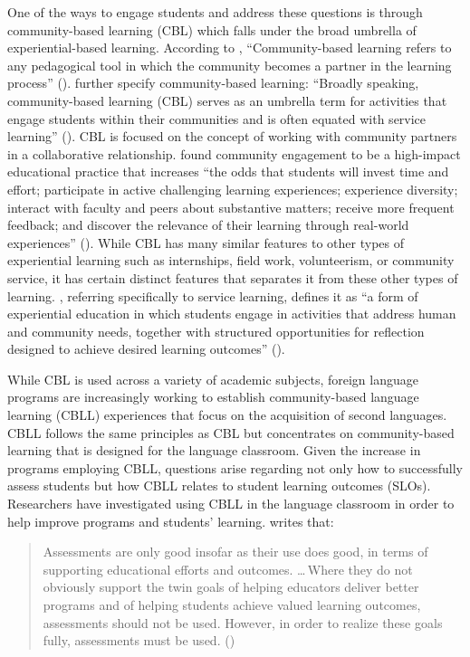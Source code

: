 \documentclass[output=paper]{langscibook}
\begin{document}
One of the ways to engage students and address these questions is through community-based learning (CBL) which falls under the broad umbrella of ex\-pe\-ri\-en\-tial-based learning. According to \citet{MooneyEdwards2001}, “Community-based learning refers to any pedagogical tool in which the community becomes a partner in the learning process” (\citeyear[182]{MooneyEdwards2001}). \citet{CliffordReisinger2019} further specify community-based learning: “Broadly speaking, community-based learning (CBL) serves as an umbrella term for activities that engage students within their communities and is often equated with service learning” (\citeyear[5]{CliffordReisinger2019}). CBL is focused on the concept of working with community partners in a collaborative relationship. \citet{Jacoby2015} found community engagement to be a high-impact educational practice that increases “the odds that students will invest time and effort; participate in active challenging learning experiences; experience diversity; interact with faculty and peers about substantive matters; receive more frequent feedback; and discover the relevance of their learning through real-world experiences” (\citeyear[11]{Jacoby2015}). While CBL has many similar features to other types of experiential learning such as internships, field work, volunteerism, or community service, it has certain distinct features that separates it from these other types of learning. \citet{Jacoby2015}, referring specifically to service learning, defines it as “a form of experiential education in which students engage in activities that address human and community needs, together with structured opportunities for reflection designed to achieve desired learning outcomes” (\citeyear[1--2]{Jacoby2015}).

While CBL is used across a variety of academic subjects, foreign language programs are increasingly working to establish community-based language learning (CBLL) experiences that focus on the acquisition of second languages. CBLL follows the same principles as CBL but concentrates on community-based learning that is designed for the language classroom.  Given the increase in programs employing CBLL, questions arise regarding not only how to successfully assess students but how CBLL relates to student learning outcomes (SLOs). Researchers have investigated using CBLL in the language classroom in order to help improve programs and students’ learning. \citet{Norris2006} writes that:

\begin{quote}
Assessments are only good insofar as their use does good, in terms of supporting educational efforts and outcomes. \ldots\,Where they do not obviously support the twin goals of helping educators deliver better programs and of helping students achieve valued learning outcomes, assessments should not be used. However, in order to realize these goals fully, assessments must be used. (\citeyear[582]{Norris2006})
\end{quote}
\end{document}
